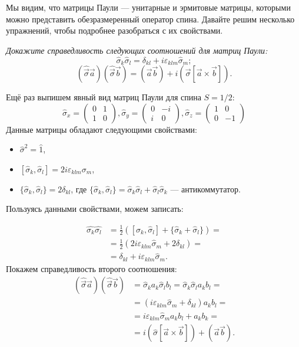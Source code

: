 Мы видим, что матрицы Паули --- унитарные и эрмитовые матрицы, которыми можно
представить обезразмеренный оператор спина. Давайте решим несколько упражнений,
чтобы подробнее разобраться с их свойствами.
\begin{exercise}
  \textit{Докажите справедливость следующих соотношений для матриц Паули:}
  \[
    \hat{\sigma}_k\hat{\sigma}_l = \delta_{kl} + i\varepsilon_{klm}\hat{\sigma}_m;
  \]
  \[
    (\hat{\Vec{\sigma}}\Vec{a})(\hat{\Vec{\sigma}}\Vec{b}) = (\Vec{a}\Vec{b}) + i(\Vec{\sigma}[\Vec{a} \times \Vec{b}]).
  \]
\end{exercise}

Ещё раз выпишем явный вид матриц Паули для спина $S=1/2$:
\[
  \hat{\sigma}_x = \left(\begin{array}{cc}
    0 & 1 \\
    1 & 0
  \end{array}
  \right),
  \hat{\sigma}_y = \left(\begin{array}{cc}
    0 & -i \\
    i & 0
  \end{array}
  \right),
  \hat{\sigma}_z = \left(\begin{array}{cc}
    1 & 0 \\
    0 & -1
  \end{array}
  \right)
\]
Данные матрицы обладают следующими свойствами:
\begin{itemize}
  \item $\hat{\sigma}^2 = \hat{1}$,
  \item $[\hat{\sigma}_k, \hat{\sigma}_l] = 2i\varepsilon_{klm}\sigma_m$,
  \item $\{\hat{\sigma}_k, \hat{\sigma}_l\} = 2\delta_{kl}$, где $\{\hat{\sigma}_k,
          \hat{\sigma}_l\} = \hat{\sigma}_k\hat{\sigma}_l + \hat{\sigma}_l\hat{\sigma}_k$
        --- антикоммутатор.
\end{itemize}
Пользуясь данными свойствами, можем записать:

\begin{align*}
  \hat{\sigma_k}\hat{\sigma_l} &= \frac{1}{2}([\hat{\sigma}_k, \hat{\sigma}_l] + \{\hat{\sigma}_k + \hat{\sigma}_l\}) = \\
  &=\frac{1}{2}(2i\varepsilon_{klm}\hat{\sigma}_m + 2\delta_{kl}) = \\
  &=\delta_{kl} + i\varepsilon_{klm}\hat{\sigma}_m.
\end{align*}
Покажем справедливость второго соотношения:
\begin{align*}
  (\hat{\Vec{\sigma}}\Vec{a})(\hat{\Vec{\sigma}}\Vec{b}) &= \hat{\sigma}_ka_k\hat{\sigma}_lb_l = \hat{\sigma}_k\hat{\sigma}_la_kb_l= \\
  &=(i\varepsilon_{klm}\hat{\sigma}_m + \delta_{kl})a_kb_l =\\
  &= i\varepsilon_{klm}\hat{\sigma}_m a_k b_l + a_k b_k =\\
  &= i(\hat{\sigma}[\Vec{a} \times \Vec{b}]) + (\Vec{a}\Vec{b}).
\end{align*}
\qedsq

